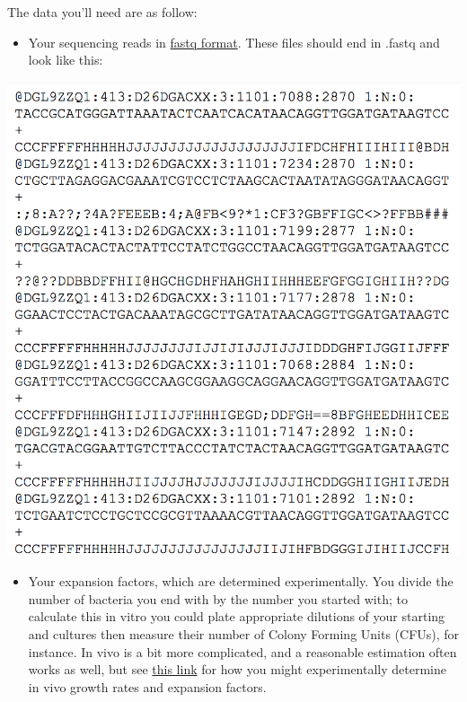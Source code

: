 \documentclass{article}
\begin{document}
\noindent
The data you'll need are as follow:

\begin{itemize}
\item Your sequencing reads in \href{http://maq.sourceforge.net/fastq.shtml}{fastq format}. These files should end in .fastq and look like this:

\end{itemize}

\includegraphics[scale=0.5]{fastq.jpg}

\begin{itemize}

\item Your expansion factors, which are determined experimentally. You divide the number of bacteria you end with by the number you started with; to calculate this in vitro you could plate appropriate dilutions of your starting and cultures then measure their number of Colony Forming Units (CFUs), for instance. In vivo is a bit more complicated, and a reasonable estimation often works as well, but see \href{http://www.ncbi.nlm.nih.gov/pmc/articles/PMC3514683/}{this link} for how you might experimentally determine in vivo growth rates and expansion factors. 

\end{itemize}
\end{document}
